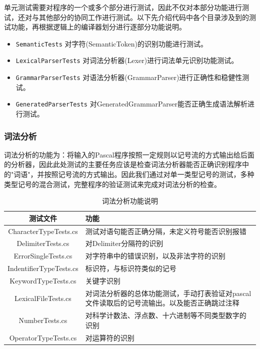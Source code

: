 \documentclass[../main.tex]{subfiles}
\begin{document}
单元测试需要对程序的一个或多个部分进行测试，因此不仅对本部分功能进行测试，还对与其他部分的协同工作进行测试。以下先介绍代码中各个目录涉及到的测试功能，再根据逻辑上的编译器划分进行逐部分功能说明。

\begin{itemize}
    \item \texttt{SemanticTests} 对字符(SemanticToken)的识别功能进行测试。
    \item \texttt{LexicalParserTests} 对词法分析器(Lexer)进行词法单元识别功能测试。
    \item \texttt{GrammarParserTests} 对语法分析器(GrammarParser)进行正确性和稳健性测试。
    \item \texttt{GeneratedParserTests} 对GeneratedGrammarParser能否正确生成语法解析进行测试。
\end{itemize}

\subsubsection{词法分析}

词法分析的功能为：将输入的Pascal程序按照一定规则以记号流的方式输出给后面的分析器，因此此处测试的主要任务应该是检查词法分析器能否正确识别程序中的"词语"，并按照记号流的方式输出。因此我们通过对单一类型记号的测试，多种类型记号的混合测试，完整程序的验证测试来完成对词法分析的检查。

\begin{table}[H] %
\centering %
\caption{
\label{tab:test}词法分析功能说明} 
\begin{tabular}{c|p{10cm}} %
\hline
\textbf{测试文件} & \textbf{功能} \\ 
\hline
CharacterTypeTests.cs & 测试对语句能否正确分隔，未定义符号能否识别报错 \\ 
DelimiterTests.cs & 对Delimiter分隔符的识别 \\ 
ErrorSingleTests.cs & 对字符串中的错误识别，以及非法字符的识别 \\ 
IndentifierTypeTests.cs & 标识符，与标识符类似的记号 \\
KeywordTypeTests.cs & 关键字识别 \\
LexicalFileTests.cs & 对词法分析器的总体功能测试，手动打表验证对pascal文件读取后的记号流输出。以及能否正确跳过注释 \\
NumberTests.cs & 对科学计数法、浮点数、十六进制等不同类型数字的识别 \\
OperatorTypeTests.cs & 对运算符的识别 \\
\hline
\end{tabular}
\end{table}
\end{document}

